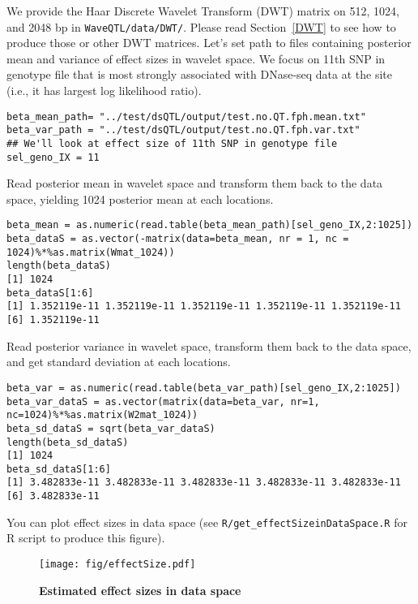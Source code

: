 \documentclass[11pt]{article}
\begin{document}
We provide the Haar Discrete Wavelet Transform (DWT) matrix on 512, 1024, and 2048 bp in {\tt WaveQTL/data/DWT/}. Please read Section~\ref{DWT} to see how to produce those or other DWT matrices.  
Let's set path to files containing posterior mean and variance of effect sizes in wavelet space. We focus on 11th SNP in genotype file that is most strongly associated with DNase-seq data at the site (i.e., it has largest log likelihood ratio). 
\begin{verbatim}
beta_mean_path= "../test/dsQTL/output/test.no.QT.fph.mean.txt"
beta_var_path = "../test/dsQTL/output/test.no.QT.fph.var.txt"
## We'll look at effect size of 11th SNP in genotype file
sel_geno_IX = 11
\end{verbatim}
Read posterior mean in wavelet space and transform them back to the data space, yielding 1024 posterior mean at each locations.  
\begin{verbatim}
beta_mean = as.numeric(read.table(beta_mean_path)[sel_geno_IX,2:1025])
beta_dataS = as.vector(-matrix(data=beta_mean, nr = 1, nc = 1024)%*%as.matrix(Wmat_1024))
length(beta_dataS)
[1] 1024
beta_dataS[1:6]
[1] 1.352119e-11 1.352119e-11 1.352119e-11 1.352119e-11 1.352119e-11
[6] 1.352119e-11
\end{verbatim}
Read posterior variance in wavelet space, transform them back to the data space, and get standard deviation at each locations.  
\begin{verbatim}
beta_var = as.numeric(read.table(beta_var_path)[sel_geno_IX,2:1025])
beta_var_dataS = as.vector(matrix(data=beta_var, nr=1, nc=1024)%*%as.matrix(W2mat_1024))
beta_sd_dataS = sqrt(beta_var_dataS)
length(beta_sd_dataS)
[1] 1024
beta_sd_dataS[1:6]
[1] 3.482833e-11 3.482833e-11 3.482833e-11 3.482833e-11 3.482833e-11
[6] 3.482833e-11
\end{verbatim}
You can plot effect sizes in data space (see {\tt R/get\_effectSizeinDataSpace.R} for R script to produce this figure).
\begin{figure}
\center
\texttt{[image: fig/effectSize.pdf]}
\caption[]{\label{effectSize:fig} {\bf Estimated effect sizes in data space} 
}
\end{figure}
\end{document}
